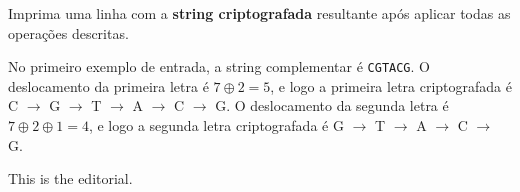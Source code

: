Imprima uma linha com a \textbf{string criptografada} resultante após aplicar todas as operações descritas.
\vspace{-0.7cm}

No primeiro exemplo de entrada, a string complementar é \texttt{CGTACG}. O deslocamento da primeira letra é $7 \oplus 2 = 5$, e logo a primeira letra criptografada é C $\rightarrow$ G $\rightarrow$ T $\rightarrow$ A $\rightarrow$ C $\rightarrow$ G.  O deslocamento da segunda letra é $7 \oplus 2 \oplus 1 = 4$, e logo a segunda letra criptografada é G $\rightarrow$ T $\rightarrow$ A $\rightarrow$ C $\rightarrow$ G.


This is the editorial.

